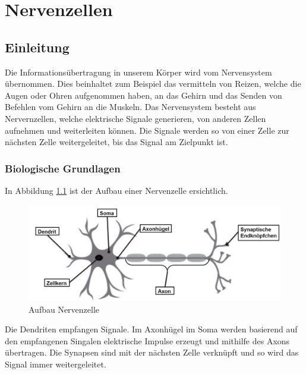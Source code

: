 %
%
%
%
\chapter{Nervenzellen\label{chapter:nerven}}
\begin{refsection}
\section{Einleitung}

Die Informationsübertragung in unserem Körper wird vom Nervensystem übernommen.
Dies beinhaltet zum Beispiel das vermitteln von Reizen, welche die Augen oder Ohren aufgenommen haben,
an das Gehirn und das Senden von Befehlen vom Gehirn an die Muskeln.
Das Nervensystem besteht aus Nervernzellen, welche elektrische Signale generieren, von anderen Zellen aufnehmen und weiterleiten können.
Die Signale werden so von einer Zelle zur nächsten Zelle weitergeleitet, bis das Signal am Zielpunkt ist.
\subsection{Biologische Grundlagen}
In Abbildung \ref{fig:Aufbau Nervenzelle} ist der Aufbau einer Nervenzelle ersichtlich. 
\begin{figure}[h]
    \centering
    \includegraphics[width=\textwidth]{papers/nerven/Bilder/NervenAufbau2.png}
    \caption{Aufbau Nervenzelle \cite{nervern:rosadu}}
    \label{fig:Aufbau Nervenzelle}
\end{figure}

Die Dendriten empfangen Signale. 
Im Axonhügel im Soma werden basierend auf den empfangenen Singalen elektrische Impulse erzeugt und mithilfe des Axons übertragen.
Die Synapsen sind mit der nächsten Zelle verknüpft und so wird das Signal immer weitergeleitet.


\end{refsection}
